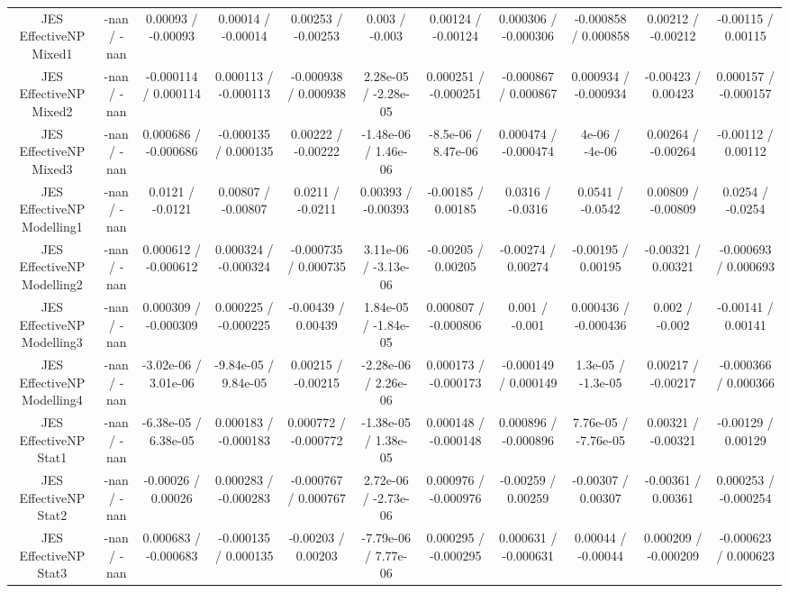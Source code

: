 \begin{table}[htbp]
\begin{center}
\begin{tabular}{|c|c|c|c|c|c|c|c|c|c|c|}
  JES EffectiveNP Mixed1 & -nan / -nan & 0.00093 / -0.00093 & 0.00014 / -0.00014 & 0.00253 / -0.00253 & 0.003 / -0.003 & 0.00124 / -0.00124 & 0.000306 / -0.000306 & -0.000858 / 0.000858 & 0.00212 / -0.00212 & -0.00115 / 0.00115 \\ 
  JES EffectiveNP Mixed2 & -nan / -nan & -0.000114 / 0.000114 & 0.000113 / -0.000113 & -0.000938 / 0.000938 & 2.28e-05 / -2.28e-05 & 0.000251 / -0.000251 & -0.000867 / 0.000867 & 0.000934 / -0.000934 & -0.00423 / 0.00423 & 0.000157 / -0.000157 \\ 
  JES EffectiveNP Mixed3 & -nan / -nan & 0.000686 / -0.000686 & -0.000135 / 0.000135 & 0.00222 / -0.00222 & -1.48e-06 / 1.46e-06 & -8.5e-06 / 8.47e-06 & 0.000474 / -0.000474 & 4e-06 / -4e-06 & 0.00264 / -0.00264 & -0.00112 / 0.00112 \\ 
  JES EffectiveNP Modelling1 & -nan / -nan & 0.0121 / -0.0121 & 0.00807 / -0.00807 & 0.0211 / -0.0211 & 0.00393 / -0.00393 & -0.00185 / 0.00185 & 0.0316 / -0.0316 & 0.0541 / -0.0542 & 0.00809 / -0.00809 & 0.0254 / -0.0254 \\ 
  JES EffectiveNP Modelling2 & -nan / -nan & 0.000612 / -0.000612 & 0.000324 / -0.000324 & -0.000735 / 0.000735 & 3.11e-06 / -3.13e-06 & -0.00205 / 0.00205 & -0.00274 / 0.00274 & -0.00195 / 0.00195 & -0.00321 / 0.00321 & -0.000693 / 0.000693 \\ 
  JES EffectiveNP Modelling3 & -nan / -nan & 0.000309 / -0.000309 & 0.000225 / -0.000225 & -0.00439 / 0.00439 & 1.84e-05 / -1.84e-05 & 0.000807 / -0.000806 & 0.001 / -0.001 & 0.000436 / -0.000436 & 0.002 / -0.002 & -0.00141 / 0.00141 \\ 
  JES EffectiveNP Modelling4 & -nan / -nan & -3.02e-06 / 3.01e-06 & -9.84e-05 / 9.84e-05 & 0.00215 / -0.00215 & -2.28e-06 / 2.26e-06 & 0.000173 / -0.000173 & -0.000149 / 0.000149 & 1.3e-05 / -1.3e-05 & 0.00217 / -0.00217 & -0.000366 / 0.000366 \\ 
  JES EffectiveNP Stat1 & -nan / -nan & -6.38e-05 / 6.38e-05 & 0.000183 / -0.000183 & 0.000772 / -0.000772 & -1.38e-05 / 1.38e-05 & 0.000148 / -0.000148 & 0.000896 / -0.000896 & 7.76e-05 / -7.76e-05 & 0.00321 / -0.00321 & -0.00129 / 0.00129 \\ 
  JES EffectiveNP Stat2 & -nan / -nan & -0.00026 / 0.00026 & 0.000283 / -0.000283 & -0.000767 / 0.000767 & 2.72e-06 / -2.73e-06 & 0.000976 / -0.000976 & -0.00259 / 0.00259 & -0.00307 / 0.00307 & -0.00361 / 0.00361 & 0.000253 / -0.000254 \\ 
  JES EffectiveNP Stat3 & -nan / -nan & 0.000683 / -0.000683 & -0.000135 / 0.000135 & -0.00203 / 0.00203 & -7.79e-06 / 7.77e-06 & 0.000295 / -0.000295 & 0.000631 / -0.000631 & 0.00044 / -0.00044 & 0.000209 / -0.000209 & -0.000623 / 0.000623 \\ 

\end{tabular}
\end{center}
\end{table}
